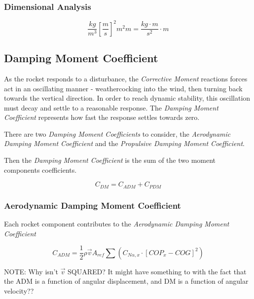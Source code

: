 \documentclass[]{book}
\begin{document}
\subsubsection{Dimensional Analysis}\label{dimensional-analysis}

\begin{equation}
\label{eq_c1_dim_anal}
\dfrac{kg}{m^3} \left[ \dfrac{m}{s} \right]^2 m^2 m = \dfrac{kg \cdot m }{s^2} \cdot m 
\end{equation}

\subsection{Damping Moment
Coefficient}\label{damping-moment-coefficient}

As the rocket responds to a disturbance, the \emph{Corrective Moment}
reactions forces act in an oscillating manner - weathercocking into the
wind, then turning back towards the vertical direction. In order to
reach dynamic stability, this oscillation must decay and settle to a
reasonable response. The \emph{Damping Moment Coefficient} represents
how fast the response settles towards zero.

There are two \emph{Damping Moment Coefficients} to consider, the
\emph{Aerodynamic Damping Moment Coefficient} and the \emph{Propulsive
Damping Moment Coefficient}.

Then the \emph{Damping Moment Coefficient} is the sum of the two moment
components coefficients.

\begin{equation}
\label{eq_coef_moment_damping}
C_{DM} = C_{ADM} + C_{PDM}
\end{equation}

\subsubsection{Aerodynamic Damping Moment
Coefficient}\label{aerodynamic-damping-moment-coefficient}

Each rocket component contributes to the \emph{Aerodynamic Damping
Moment Coefficient}

\begin{equation}
\label{eq_coef_moment_damping_aero}
C_{ADM} = \dfrac{1}{2} \rho \vec{v} A_{ref} \sum \left( C_{N \alpha,x} \cdot \left[ COP_{x} - COG \right]^2  \right) 
\end{equation}

NOTE: Why isn't \(\vec{v}\) SQUARED? It might have something to with the
fact that the ADM is a function of angular displacement, and DM is a
function of angular velocity??
\end{document}

